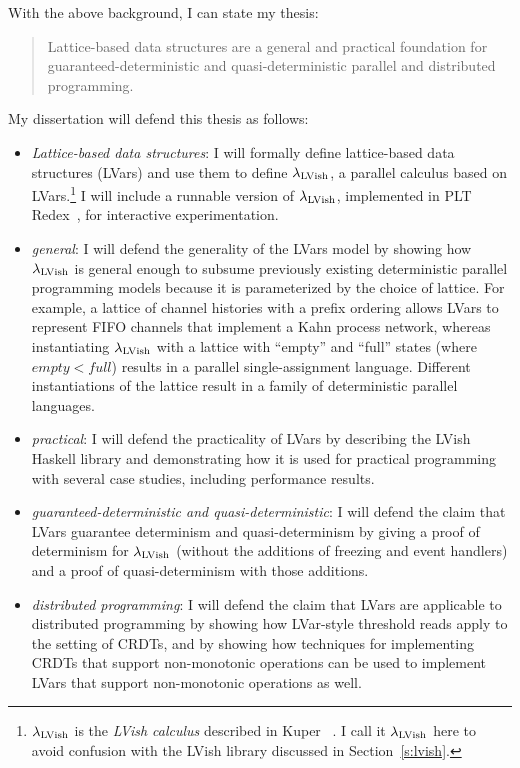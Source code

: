 \documentclass{article}
\begin{document}

With the above background, I can state my thesis:
\begin{quote}
  Lattice-based data structures are a general and practical foundation
  for guaranteed-deterministic and quasi-deterministic parallel and
  distributed programming.
\end{quote}
My dissertation will defend this thesis as follows:
\begin{itemize}
  \item \emph{Lattice-based data structures}: I will formally define
    lattice-based data structures (LVars) and use them to define
    $\lambda_{\textrm{LVish}}$, a parallel calculus based on
    LVars.\footnote{$\lambda_{\textrm{LVish}}$ is the \emph{LVish calculus}
      described in Kuper \etal~\cite{Freeze-paper}.  I call it
      $\lambda_{\textrm{LVish}}$ here to avoid confusion with the LVish library
      discussed in Section~\ref{s:lvish}.}  I will include a runnable
    version of $\lambda_{\textrm{LVish}}$, implemented in PLT
    Redex~\cite{redex-book}, for interactive experimentation.

  \item \emph{general}: I will defend the generality of the LVars
    model by showing how $\lambda_{\textrm{LVish}}$ is general enough to subsume
    previously existing deterministic parallel programming models
    because it is parameterized by the choice of lattice.  For
    example, a lattice of channel histories with a prefix ordering
    allows LVars to represent FIFO channels that implement a Kahn
    process network, whereas instantiating $\lambda_{\textrm{LVish}}$ with a
    lattice with ``empty'' and ``full'' states (where $\mathit{empty}
    < \mathit{full}$) results in a parallel single-assignment
    language.  Different instantiations of the lattice result in a
    family of deterministic parallel languages.

  \item \emph{practical}: I will defend the practicality of LVars by
    describing the LVish Haskell library and demonstrating how it is
    used for practical programming with several case studies,
    including performance results.

  \item \emph{guaranteed-deterministic and quasi-deterministic}: I
    will defend the claim that LVars guarantee determinism and
    quasi-determinism by giving a proof of determinism for
    $\lambda_{\textrm{LVish}}$ (without the additions of freezing and event
    handlers) and a proof of quasi-determinism with those additions.

  \item \emph{distributed programming}: I will defend the claim that
    LVars are applicable to distributed programming by showing how
    LVar-style threshold reads apply to the setting of CRDTs, and by
    showing how techniques for implementing CRDTs that support
    non-monotonic operations can be used to implement LVars that
    support non-monotonic operations as well.
\end{itemize}
\end{document}
